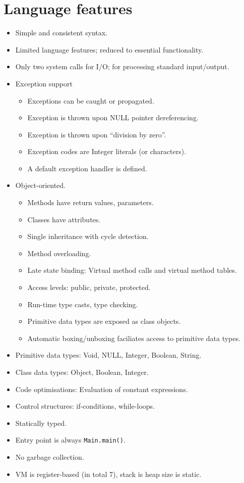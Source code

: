 \documentclass{guide}
\begin{document}
	\section{Language features}
	\begin{itemize}
		\item Simple and consistent syntax.
		\item Limited language features; reduced to essential functionality.
		\item Only two system calls for I/O; for processing standard input/output.
		\item Exception support
			\begin{itemize}
				\item Exceptions can be caught or propagated.
				\item Exception is thrown upon NULL pointer dereferencing.
				\item Exception is thrown upon ``division by zero''.
				\item Exception codes are Integer literals (or characters).
				\item A default exception handler is defined.
			\end{itemize}
		\item Object-oriented.
			\begin{itemize}
				\item Methods have return values, parameters.
				\item Classes have attributes.
				\item Single inheritance with cycle detection.
				\item Method overloading.
				\item Late state binding: Virtual method calls and virtual method tables.
				\item Access levels: public, private, protected.
				\item Run-time type casts, type checking.
				\item Primitive data types are exposed as class objects.
				\item Automatic boxing/unboxing faciliates access to primitive data types.
			\end{itemize}
		\item Primitive data types: Void, NULL, Integer, Boolean, String.
		\item Class data types: Object, Boolean, Integer.
		\item Code optimisations: Evaluation of constant expressions.
		\item Control structures: if-conditions, while-loops.
		\item Statically typed.
		\item Entry point is always \texttt{Main.main()}.
		\item No garbage collection.
		\item VM is register-based (in total 7), stack is heap size is static.
	\end{itemize}
\end{document}
